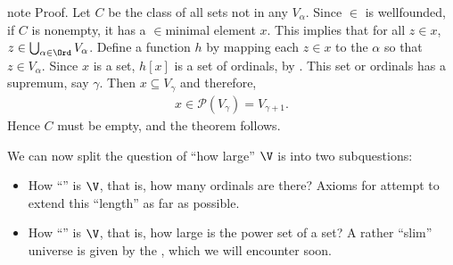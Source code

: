 \documentclass[letterpaper,10pt,english]{jupyterBook}
\begin{document}
\begin{sphinxadmonition}{note}
\sphinxAtStartPar
Proof. Let \(C\) be the class of all sets not in any \(V_\alpha\). Since \(\in\) is well\sphinxhyphen{}founded, if \(C\) is non\sphinxhyphen{}empty, it has a \(\in\)\sphinxhyphen{}minimal element \(x\). This implies that for all \(z \in x\), \(z \in \bigcup_{\alpha \in \Ord} V_\alpha\). Define a function \(h\) by mapping each \(z\in x\) to the  \(\alpha\) so that \(z \in V_\alpha\). Since \(x\) is a set, \(h[x]\) is a set of ordinals, by . This set or ordinals has a supremum, say \(\gamma\). Then \(x \subseteq V_\gamma\) and therefore,
\begin{equation*}
\begin{split}
x \in \mathcal{P}(V_\gamma) = V_{\gamma+1}.
\end{split}
\end{equation*}
\sphinxAtStartPar
Hence \(C\) must be empty, and the theorem follows.
\end{sphinxadmonition}

\sphinxAtStartPar
We can now split the question of “how large” \(\V\) is into two sub\sphinxhyphen{}questions:
\begin{itemize}
\item {} 
\sphinxAtStartPar
How “” is \(\V\), that is, how many ordinals are there? Axioms for  attempt to extend this “length” as far as possible.

\item {} 
\sphinxAtStartPar
How “” is \(\V\), that is, how large is the power set of a set? A rather “slim” universe is given by the , which we will encounter soon.

\end{itemize}

\sphinxstepscope
\end{document}
